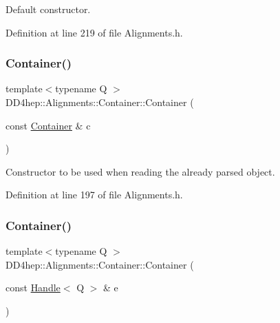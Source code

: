 Default constructor. 



Definition at line 219 of file Alignments.\+h.

\hypertarget{class_d_d4hep_1_1_alignments_1_1_container_adecc9202a1c2d2eb7f4048d441000d17}{}\label{class_d_d4hep_1_1_alignments_1_1_container_adecc9202a1c2d2eb7f4048d441000d17} 
\subsubsection{\texorpdfstring{Container()}{Container()}\hspace{0.1cm}{\footnotesize\ttfamily [2/3]}}
{\footnotesize\ttfamily template$<$typename Q $>$ \\
D\+D4hep\+::\+Alignments\+::\+Container\+::\+Container (\begin{DoxyParamCaption}\item[{const \hyperlink{class_d_d4hep_1_1_alignments_1_1_container}{Container} \&}]{c }\end{DoxyParamCaption})\hspace{0.3cm}{\ttfamily [inline]}}



Constructor to be used when reading the already parsed object. 



Definition at line 197 of file Alignments.\+h.

\hypertarget{class_d_d4hep_1_1_alignments_1_1_container_a7225fa99b3090f49b485910e82d9484a}{}\label{class_d_d4hep_1_1_alignments_1_1_container_a7225fa99b3090f49b485910e82d9484a} 
\subsubsection{\texorpdfstring{Container()}{Container()}\hspace{0.1cm}{\footnotesize\ttfamily [3/3]}}
{\footnotesize\ttfamily template$<$typename Q $>$ \\
D\+D4hep\+::\+Alignments\+::\+Container\+::\+Container (\begin{DoxyParamCaption}\item[{const \hyperlink{class_d_d4hep_1_1_handle}{Handle}$<$ Q $>$ \&}]{e }\end{DoxyParamCaption})\hspace{0.3cm}{\ttfamily [inline]}}



